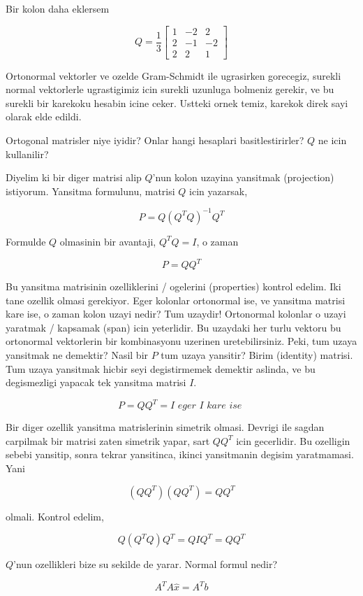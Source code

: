 \documentclass[12pt,fleqn]{article}\usepackage{../common}
\begin{document}
Bir kolon daha eklersem 

\[ Q = \frac{ 1}{3}
\left[\begin{array}{rrr}
1 & -2 & 2\\
2 & -1 & -2 \\
2 & 2 & 1
\end{array}\right]
 \]

Ortonormal vektorler ve ozelde Gram-Schmidt ile ugrasirken gorecegiz,
surekli normal vektorlerle ugrastigimiz icin surekli uzunluga bolmeniz
gerekir, ve bu surekli bir karekoku hesabin icine ceker. Ustteki ornek
temiz, karekok direk sayi olarak elde edildi. 

Ortogonal matrisler niye iyidir? Onlar hangi hesaplari basitlestirirler?
$Q$ ne icin kullanilir? 

Diyelim ki bir diger matrisi alip $Q$'nun kolon uzayina yansitmak
(projection) istiyorum. Yansitma formulunu, matrisi $Q$ icin yazarsak,

\[ P = Q (Q^TQ)^{-1}Q^T \]

Formulde $Q$ olmasinin bir avantaji, $Q^TQ = I$, o zaman 

\[ P = Q Q^T \]

Bu yansitma matrisinin ozelliklerini / ogelerini (properties) kontrol
edelim. Iki tane ozellik olmasi gerekiyor. Eger kolonlar ortonormal ise, ve
yansitma matrisi kare ise, o zaman kolon uzayi nedir? Tum uzaydir!
Ortonormal kolonlar o uzayi yaratmak / kapsamak (span) icin
yeterlidir. Bu uzaydaki her turlu vektoru bu ortonormal vektorlerin bir
kombinasyonu uzerinen uretebilirsiniz. Peki, tum uzaya yansitmak ne
demektir? Nasil bir $P$ tum uzaya yansitir? Birim (identity) matrisi. Tum
uzaya yansitmak hicbir seyi degistirmemek demektir aslinda, ve bu
degismezligi yapacak tek yansitma matrisi $I$. 

\[ P = Q Q^T = I \textit{ eger I kare ise }\]

Bir diger ozellik yansitma matrislerinin simetrik olmasi. Devrigi ile
sagdan carpilmak bir matrisi zaten simetrik yapar, sart $QQ^T$ icin
gecerlidir. Bu ozelligin sebebi yansitip, sonra tekrar yansitinca, ikinci
yansitmanin degisim yaratmamasi. Yani 

\[ (QQ^T)(QQ^T) = QQ^T \]

olmali. Kontrol edelim,

\[ Q(Q^TQ)Q^T = QIQ^T = QQ^T\]

$Q$'nun ozellikleri bize su sekilde de yarar. Normal formul nedir? 

\[ A^TA\hat{x} = A^Tb \]
\end{document}
